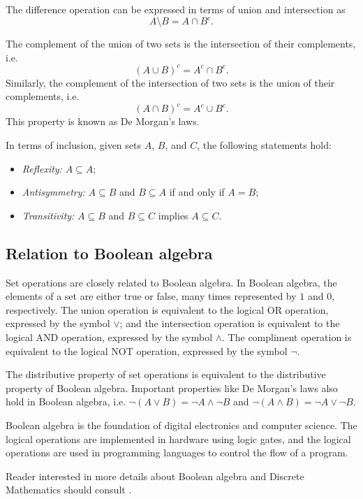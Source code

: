 The difference operation can be expressed in terms of union and intersection as
\[
  A \setminus B = A \cap B^c\text{.}
\]

The complement of the union of two sets is the intersection of their complements, i.e.
\[
  (A \cup B)^c = A^c \cap B^c\text{.}
\]
Similarly, the complement of the intersection of two sets is the union of their complements, i.e.
\[
  (A \cap B)^c = A^c \cup B^c\text{.}
\]
This property is known as De Morgan's laws.

In terms of inclusion, given sets $A$, $B$, and $C$, the following statements hold:
\begin{itemize}
  \item \emph{Reflexity:} $A \subseteq A$;
  \item \emph{Antisymmetry:} $A \subseteq B$ and $B \subseteq A$ if and only if $A = B$;
  \item \emph{Transitivity:} $A \subseteq B$ and $B \subseteq C$ implies $A \subseteq C$.
\end{itemize}

\subsection{Relation to Boolean algebra}

Set operations are closely related to Boolean algebra.  In Boolean algebra, the elements
of a set are either true or false, many times represented by $1$ and $0$, respectively.
The union operation is equivalent to the logical OR operation, expressed by the symbol
$\lor$; and the intersection operation is equivalent to the logical AND operation,
expressed by the symbol $\land$.  The compliment operation is equivalent to the logical
NOT operation, expressed by the symbol $\lnot$.

The distributive property of set operations is equivalent to the distributive property of
Boolean algebra.  Important properties like De Morgan's laws also hold in Boolean algebra,
i.e. $\lnot (A \lor B) = \lnot A \land \lnot B$ and $\lnot (A \land B) = \lnot A \lor
\lnot B$.

Boolean algebra is the foundation of digital electronics and computer science.  The
logical operations are implemented in hardware using logic gates, and the logical
operations are used in programming languages to control the flow of a program.

Reader interested in more details about Boolean algebra and Discrete Mathematics
should consult \textcite{Rosen2018}.


